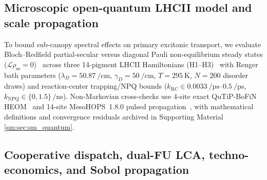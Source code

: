 \documentclass[preprint,12pt,a4paper]{elsarticle}
\begin{document}
\subsection{Microscopic open-quantum LHCII model and scale propagation}
\label{sec:methods_quantum}

To bound sub-canopy spectral effects on primary excitonic transport, we evaluate Bloch--Redfield partial-secular versus diagonal Pauli non-equilibrium steady states ($\mathcal{L}\rho_{\mathrm{ss}}=0$)~\cite{Renger2003,Novoderezhkin2011,Muh2010,Kim2025SciAdv} across three 14-pigment LHCII Hamiltonians (H1--H3)~\cite{Novoderezhkin2011,Muh2010,Zhu2024JCTC} with Renger bath parameters ($\lambda_D=\qty{50.87}{\per\centi\meter}$, $\gamma_D=\qty{50}{\per\centi\meter}$, $T=\qty{295}{\kelvin}$, $N=\num{200}$ disorder draws) and reaction-center trapping/NPQ bounds ($k_{\mathrm{RC}}\in\qtyrange{0.0033}{0.5}{\per\pico\second}$, $k_{\mathrm{NPQ}}\in\{\num{0},\num{1.5}\}\,\unit{\per\nano\second}$). Non-Markovian cross-checks use 4-site exact QuTiP-BoFiN HEOM~\cite{Tanimura1989,Lambert2023} and 14-site MesoHOPS~1.8.0 pulsed propagation~\cite{Suess2015,Varvelo2021,Citty2024}, with mathematical definitions and convergence residuals archived in Supporting Material \cref{sm:sec:sm_quantum}.

\subsection{Cooperative dispatch, dual-FU LCA, techno-economics, and Sobol propagation}
\label{sec:methods_tea}
\end{document}
